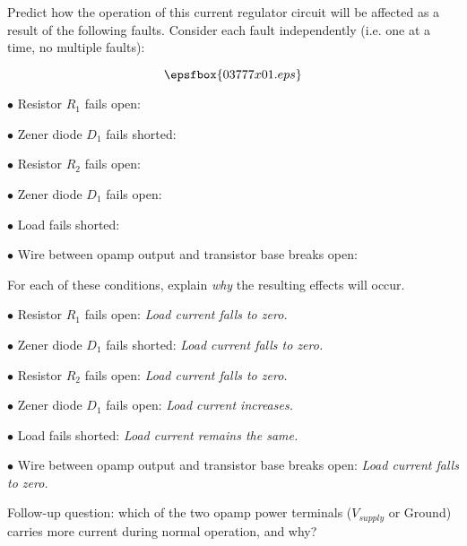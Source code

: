 

Predict how the operation of this current regulator circuit will be affected as a result of the following faults.  Consider each fault independently (i.e. one at a time, no multiple faults):

$$\epsfbox{03777x01.eps}$$

\medskip
\item{$\bullet$} Resistor $R_1$ fails open:
\vskip 5pt
\item{$\bullet$} Zener diode $D_1$ fails shorted:
\vskip 5pt
\item{$\bullet$} Resistor $R_2$ fails open:
\vskip 5pt
\item{$\bullet$} Zener diode $D_1$ fails open:
\vskip 5pt
\item{$\bullet$} Load fails shorted:
\vskip 5pt
\item{$\bullet$} Wire between opamp output and transistor base breaks open:
\medskip

For each of these conditions, explain {\it why} the resulting effects will occur.







\medskip
\item{$\bullet$} Resistor $R_1$ fails open: {\it Load current falls to zero.}
\vskip 5pt
\item{$\bullet$} Zener diode $D_1$ fails shorted: {\it Load current falls to zero.}
\vskip 5pt
\item{$\bullet$} Resistor $R_2$ fails open: {\it Load current falls to zero.}
\vskip 5pt
\item{$\bullet$} Zener diode $D_1$ fails open: {\it Load current increases.}
\vskip 5pt
\item{$\bullet$} Load fails shorted: {\it Load current remains the same.}
\vskip 5pt
\item{$\bullet$} Wire between opamp output and transistor base breaks open: {\it Load current falls to zero.}
\medskip

\vskip 10pt

Follow-up question: which of the two opamp power terminals ($V_{supply}$ or Ground) carries more current during normal operation, and why?

